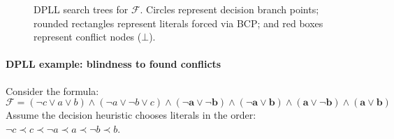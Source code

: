 \documentclass[a4paper, 11pt]{report}
\begin{document}
\begin{figure}[h!]
\caption{DPLL search trees for $\mathcal{F}$. Circles represent decision branch points; rounded rectangles represent literals forced via BCP; and red boxes represent conflict nodes ($\bot$).}
\end{figure}
\vspace{-1em}
\paragraph{DPLL example: blindness to found conflicts}

Consider the formula:
$$
\mathcal{F} = (\neg c \vee a \vee b) \wedge (\neg a \vee \neg b \vee c) \wedge \mathbf{(\neg a \vee \neg b) \wedge (\neg a \vee b) \wedge (a \vee \neg b) \wedge (a \vee b)}
$$
Assume the decision heuristic chooses literals in the order: $\neg c \prec c \prec \neg a \prec a \prec \neg b \prec b$.
\end{document}
